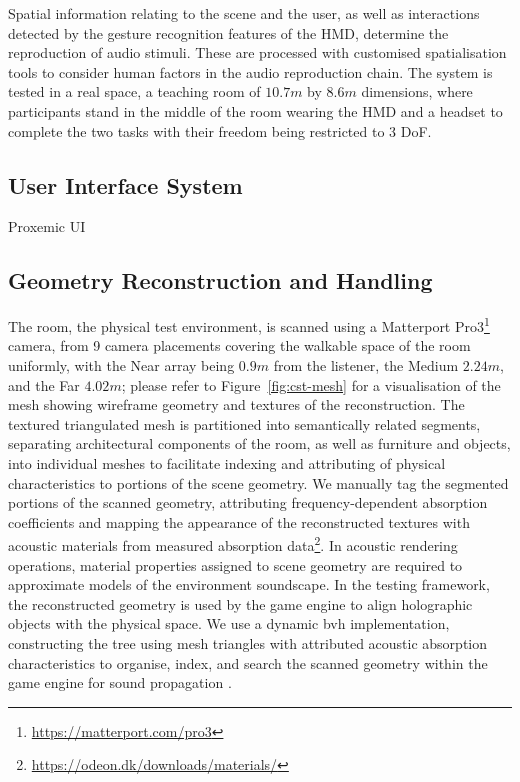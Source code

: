 Spatial information relating to the scene and the user, as well as interactions detected by the gesture recognition features of the HMD, determine the reproduction of audio stimuli. These are processed with customised spatialisation tools to consider human factors in the audio reproduction chain. The system is tested in a real space, a teaching room of $10.7m$ by $8.6m$ dimensions, where participants stand in the middle of the room wearing the HMD and a headset to complete the two tasks with their freedom being restricted to 3 DoF.\par

\subsection{User Interface System}
Proxemic UI


\subsection{Geometry Reconstruction and Handling}
The room, the physical test environment, is scanned using a Matterport Pro3\footnote{\url{https://matterport.com/pro3}} camera, from 9 camera placements covering the walkable space of the room uniformly, with the Near array being $0.9m$ from the listener, the Medium $2.24m$, and the Far $4.02m$; please refer to Figure~\ref{fig:cst-mesh} for a visualisation of the mesh showing wireframe geometry and textures of the reconstruction. The textured triangulated mesh is partitioned into semantically related segments, separating architectural components of the room, as well as furniture and objects, into individual meshes to facilitate indexing and attributing of physical characteristics to portions of the scene geometry. We manually tag the segmented portions of the scanned geometry, attributing frequency-dependent absorption coefficients and mapping the appearance of the reconstructed textures with acoustic materials from measured absorption data\footnote{\url{https://odeon.dk/downloads/materials/}}. In acoustic rendering operations, material properties assigned to scene geometry are required to approximate models of the environment soundscape. 
In the testing framework, the reconstructed geometry is used by the game engine to align holographic objects with the physical space. We use a dynamic \acrshort{bvh} implementation, constructing the tree using mesh triangles with attributed acoustic absorption characteristics to organise, index, and search the scanned geometry within the game engine for sound propagation \citep{kopta2012fast}.\par

